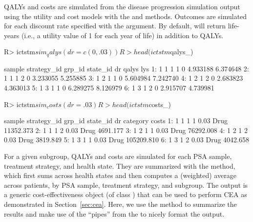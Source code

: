 \documentclass[article, nojss]{jss}\usepackage[]{graphicx}\usepackage[]{color}
\begin{document}
QALYs and costs are simulated from the disease progression simulation output using the utility and cost models with the  and  methods. Outcomes are simulated for each discount rate specified with the  argument. By default,  will return life-years (i.e., a utility value of 1 for each year of life) in addition to QALYs. 

\begin{Schunk}
\begin{Sinput}
R> ictstm$sim_qalys(dr = c(0,.03))
R> head(ictstm$qalys_)
\end{Sinput}
\begin{Soutput}
   sample strategy_id grp_id state_id dr    qalys      lys
1:      1           1      1        1  0 4.933188 6.374648
2:      1           1      1        2  0 3.233055 5.255885
3:      1           2      1        1  0 5.604984 7.242740
4:      1           2      1        2  0 2.683823 4.363013
5:      1           3      1        1  0 6.289275 8.126979
6:      1           3      1        2  0 2.915707 4.739981
\end{Soutput}
\end{Schunk}

\begin{Schunk}
\begin{Sinput}
R> ictstm$sim_costs(dr = .03)
R> head(ictstm$costs_)
\end{Sinput}
\begin{Soutput}
   sample strategy_id grp_id state_id   dr category      costs
1:      1           1      1        1 0.03     Drug  11352.373
2:      1           1      1        2 0.03     Drug   4691.177
3:      1           2      1        1 0.03     Drug  76292.008
4:      1           2      1        2 0.03     Drug   3819.849
5:      1           3      1        1 0.03     Drug 105209.810
6:      1           3      1        2 0.03     Drug   4042.658
\end{Soutput}
\end{Schunk}

For a given subgroup, QALYs and costs are simulated for each PSA sample, treatment strategy, and health state. They are summarized with the  method, which first sums across health states and then computes a (weighted) average across patients, by PSA sample, treatment strategy, and subgroup. The output is a generic cost-effectiveness object (of class ) that can be used to perform CEA as demonstrated in Section~\ref{sec:cea}. Here, we use the  method to summarize the results and make use of the ``pipes'' from the  to nicely format the output. 
\end{document}
